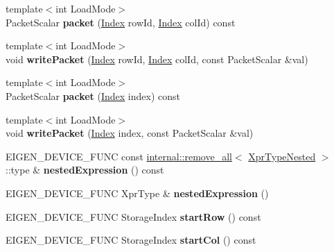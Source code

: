 \begin{DoxyCompactItemize}
{\footnotesize template$<$int Load\+Mode$>$ }\\Packet\+Scalar {\bfseries packet} (\hyperlink{namespace_eigen_a62e77e0933482dafde8fe197d9a2cfde}{Index} row\+Id, \hyperlink{namespace_eigen_a62e77e0933482dafde8fe197d9a2cfde}{Index} col\+Id) const
\item 
\mbox{\label{class_eigen_1_1internal_1_1_block_impl__dense_aaeffe51db30fa700fb40e46727dc24db}} 
{\footnotesize template$<$int Load\+Mode$>$ }\\void {\bfseries write\+Packet} (\hyperlink{namespace_eigen_a62e77e0933482dafde8fe197d9a2cfde}{Index} row\+Id, \hyperlink{namespace_eigen_a62e77e0933482dafde8fe197d9a2cfde}{Index} col\+Id, const Packet\+Scalar \&val)
\item 
\mbox{\label{class_eigen_1_1internal_1_1_block_impl__dense_a56988e0d84a8bd0bc238a90dda7fb101}} 
{\footnotesize template$<$int Load\+Mode$>$ }\\Packet\+Scalar {\bfseries packet} (\hyperlink{namespace_eigen_a62e77e0933482dafde8fe197d9a2cfde}{Index} index) const
\item 
\mbox{\label{class_eigen_1_1internal_1_1_block_impl__dense_a1529a7640b9ee5fa3508366ea5e768c2}} 
{\footnotesize template$<$int Load\+Mode$>$ }\\void {\bfseries write\+Packet} (\hyperlink{namespace_eigen_a62e77e0933482dafde8fe197d9a2cfde}{Index} index, const Packet\+Scalar \&val)
\item 
\mbox{\label{class_eigen_1_1internal_1_1_block_impl__dense_a0787c7ed9ab44398bda9ce26f4ed2917}} 
E\+I\+G\+E\+N\+\_\+\+D\+E\+V\+I\+C\+E\+\_\+\+F\+U\+NC const \hyperlink{struct_eigen_1_1internal_1_1remove__all}{internal\+::remove\+\_\+all}$<$ \hyperlink{class_eigen_1_1internal_1_1_tensor_lazy_evaluator_writable}{Xpr\+Type\+Nested} $>$\+::type \& {\bfseries nested\+Expression} () const
\item 
\mbox{\label{class_eigen_1_1internal_1_1_block_impl__dense_a286c3b51a17651242aea9c6ae44991d5}} 
E\+I\+G\+E\+N\+\_\+\+D\+E\+V\+I\+C\+E\+\_\+\+F\+U\+NC Xpr\+Type \& {\bfseries nested\+Expression} ()
\item 
\mbox{\label{class_eigen_1_1internal_1_1_block_impl__dense_a66b5ab9ca60354d0ccf089b45845fc35}} 
E\+I\+G\+E\+N\+\_\+\+D\+E\+V\+I\+C\+E\+\_\+\+F\+U\+NC Storage\+Index {\bfseries start\+Row} () const
\item 
\mbox{\label{class_eigen_1_1internal_1_1_block_impl__dense_afa5798a61fe753fb0ded7ec54b3d0812}} 
E\+I\+G\+E\+N\+\_\+\+D\+E\+V\+I\+C\+E\+\_\+\+F\+U\+NC Storage\+Index {\bfseries start\+Col} () const
\end{DoxyCompactItemize}

